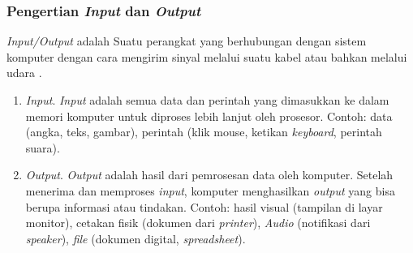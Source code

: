 \documentclass[12pt]{article}
\begin{document}
\subsubsection{Pengertian \textit{Input} dan \textit{Output}}
\textit{Input/Output} adalah Suatu perangkat yang berhubungan dengan sistem komputer dengan cara mengirim sinyal melalui suatu kabel atau bahkan melalui udara .\\
\begin{enumerate}
    \item \textit{Input}.
    \textit{Input} adalah semua data dan perintah yang dimasukkan ke dalam memori komputer untuk diproses lebih lanjut oleh prosesor.
    Contoh: data (angka, teks, gambar), perintah (klik mouse, ketikan \textit{keyboard}, perintah suara).\\
    \item \textit{Output}.
    \textit{Output} adalah hasil dari pemrosesan data oleh komputer. Setelah menerima dan memproses \textit{input}, komputer menghasilkan \textit{output} yang bisa berupa informasi atau tindakan.
    Contoh: hasil visual (tampilan di layar monitor), cetakan fisik (dokumen dari \textit{printer}), \textit{Audio} (notifikasi dari \textit{speaker}), \textit{file} (dokumen digital, \textit{spreadsheet}).\\
\end{enumerate}
\end{document}
